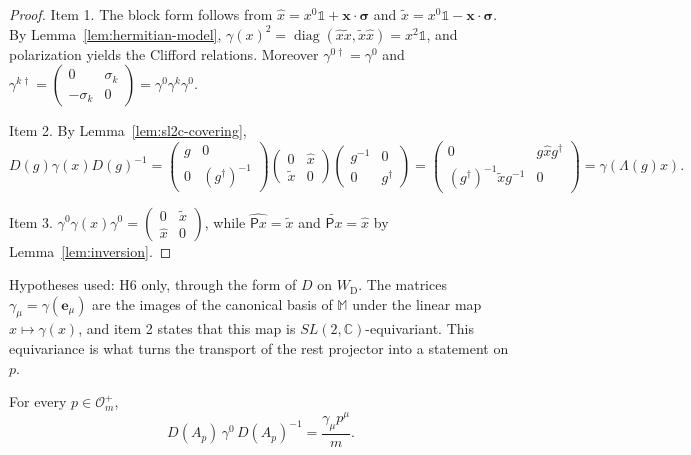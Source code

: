 \begin{proof}
	Item 1. The block form follows from $\hat{x}=x^0\mathbb{1}+\mathbf{x}\cdot\boldsymbol{\sigma}$ and $\tilde{x}=x^0\mathbb{1}-\mathbf{x}\cdot\boldsymbol{\sigma}$. By Lemma~\ref{lem:hermitian-model}, $\gamma(x)^2=\operatorname{diag}(\hat{x}\tilde{x},\tilde{x}\hat{x})=x^2\mathbb{1}$, and polarization yields the Clifford relations. Moreover $\gamma^{0\dagger}=\gamma^0$ and $\gamma^{k\dagger}=\begin{pmatrix}0&\sigma_k\\-\sigma_k&0\end{pmatrix}=\gamma^0\gamma^k\gamma^0$.
	
	Item 2. By Lemma~\ref{lem:sl2c-covering},
	\begin{equation*}
		D(g)\gamma(x)D(g)^{-1}=\begin{pmatrix}g&0\\0&(g^\dagger)^{-1}\end{pmatrix}\begin{pmatrix}0&\hat{x}\\\tilde{x}&0\end{pmatrix}\begin{pmatrix}g^{-1}&0\\0&g^\dagger\end{pmatrix}=\begin{pmatrix}0&g\hat{x}g^\dagger\\(g^\dagger)^{-1}\tilde{x}g^{-1}&0\end{pmatrix}=\gamma(\Lambda(g)x).
	\end{equation*}
	
	Item 3. $\gamma^0\gamma(x)\gamma^0=\begin{pmatrix}0&\tilde{x}\\\hat{x}&0\end{pmatrix}$, while $\widehat{\mathsf{P}x}=\tilde{x}$ and $\widetilde{\mathsf{P}x}=\hat{x}$ by Lemma~\ref{lem:inversion}.
\end{proof}

\noindent Hypotheses used: H6 only, through the form of $D$ on $W_{\mathrm{D}}$. The matrices $\gamma_\mu=\gamma(\mathbf{e}_\mu)$ are the images of the canonical basis of $\mathbb{M}$ under the linear map $x\mapsto\gamma(x)$, and item 2 states that this map is $SL(2,\mathbb{C})$-equivariant. This equivariance is what turns the transport of the rest projector into a statement on $p$.

\begin{proposition}\label{prop:transport}
	For every $p\in\mathcal{O}_m^+$,
	\begin{equation}\label{eq:transport}
		D(A_p)\,\gamma^0\,D(A_p)^{-1}=\frac{\gamma_\mu p^\mu}{m}.
	\end{equation}
\end{proposition}

